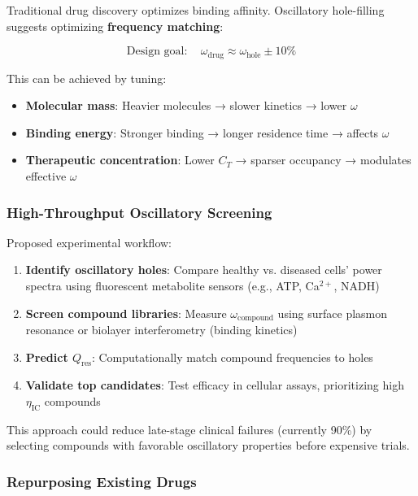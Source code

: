 \documentclass{article}
\begin{document}
Traditional drug discovery optimizes binding affinity. Oscillatory hole-filling suggests optimizing \textbf{frequency matching}:

\begin{equation}
\text{Design goal}: \quad \omega_{\text{drug}} \approx \omega_{\text{hole}} \pm 10\%
\end{equation}

This can be achieved by tuning:

\begin{itemize}
    \item \textbf{Molecular mass}: Heavier molecules → slower kinetics → lower $\omega$
    \item \textbf{Binding energy}: Stronger binding → longer residence time → affects $\omega$
    \item \textbf{Therapeutic concentration}: Lower $C_T$ → sparser occupancy → modulates effective $\omega$
\end{itemize}

\subsubsection{High-Throughput Oscillatory Screening}

Proposed experimental workflow:

\begin{enumerate}
    \item \textbf{Identify oscillatory holes}: Compare healthy vs. diseased cells' power spectra using fluorescent metabolite sensors (e.g., ATP, Ca$^{2+}$, NADH)

    \item \textbf{Screen compound libraries}: Measure $\omega_{\text{compound}}$ using surface plasmon resonance or biolayer interferometry (binding kinetics)

    \item \textbf{Predict $Q_{\text{res}}$}: Computationally match compound frequencies to holes

    \item \textbf{Validate top candidates}: Test efficacy in cellular assays, prioritizing high $\eta_{\text{IC}}$ compounds
\end{enumerate}

This approach could reduce late-stage clinical failures (currently 90\%) by selecting compounds with favorable oscillatory properties before expensive trials.

\subsubsection{Repurposing Existing Drugs}
\end{document}
